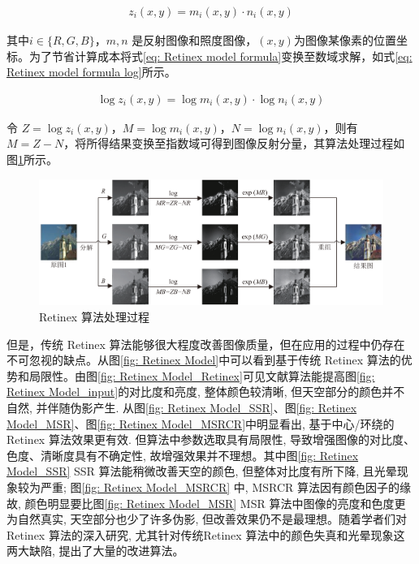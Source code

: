 \documentclass[a4paper, 10pt]{article}
\begin{document}
	\begin{equation}
		\begin{aligned}
			z_i\left(x,y\right) = m_i\left(x,y\right) \cdot n_i\left(x,y\right)
		\end{aligned}
		\label{eq: Retinex model formula}
	\end{equation}
	
	其中$i \in \{R, G, B\}$，$m,n$ 是反射图像和照度图像，$(x,y)$为图像某像素的位置坐标。为了节省计算成本将式\ref{eq: Retinex model formula}变换至数域求解，如式\ref{eq: Retinex model formula log}所示。
	
	\begin{equation}
		\begin{aligned}
			\log z_i\left(x,y\right) = \log m_i\left(x,y\right) \cdot  \log n_i\left(x,y\right)
		\end{aligned}
		\label{eq: Retinex model formula log}
	\end{equation}
	
	令 $Z = \log z_i \left(x, y\right)$，$M = \log m_i \left(x, y\right)$，$N = \log n_i \left(x, y\right)$，则有 $M = Z - N$，将所得结果变换至指数域可得到图像反射分量，其算法处理过程如图\ref{fig: Retinex model}所示。
	
	\begin{figure}[htb]
		\centering 
		\includegraphics[width=\columnwidth]{picture/LLIE/Retinex Model/Retinex Model}
		\caption{
			\label{fig: Retinex model} 
			Retinex 算法处理过程
		}
	\end{figure}
	
	但是，传统 Retinex 算法能够很大程度改善图像质量，但在应用的过程中仍存在不可忽视的缺点。从图\ref{fig: Retinex Model}中可以看到基于传统 Retinex 算法的优势和局限性。由图\ref{fig: Retinex Model_Retinex}可见文献\cite{cooper2004analysis}算法能提高图\ref{fig: Retinex Model_input}的对比度和亮度, 整体颜色较清晰, 但天空部分的颜色并不自然, 并伴随伪影产生. 从图\ref{fig: Retinex Model_SSR}、图\ref{fig: Retinex Model_MSR}、图\ref{fig: Retinex Model_MSRCR}中明显看出, 基于中心/环绕的 Retinex 算法效果更有效. 但算法中参数选取具有局限性, 导致增强图像的对比度、色度、清晰度具有不确定性, 故增强效果并不理想。其中图\ref{fig: Retinex Model_SSR} SSR 算法能稍微改善天空的颜色, 但整体对比度有所下降, 且光晕现象较为严重; 图\ref{fig: Retinex Model_MSRCR} 中, MSRCR 算法因有颜色因子的缘故, 颜色明显要比图\ref{fig: Retinex Model_MSR} MSR 算法中图像的亮度和色度更为自然真实, 天空部分也少了许多伪影, 但改善效果仍不是最理想\cite{202013}。随着学者们对Retinex 算法的深入研究, 尤其针对传统Retinex 算法中的颜色失真和光晕现象这两大缺陷, 提出了大量的改进算法。
	
\end{document}
